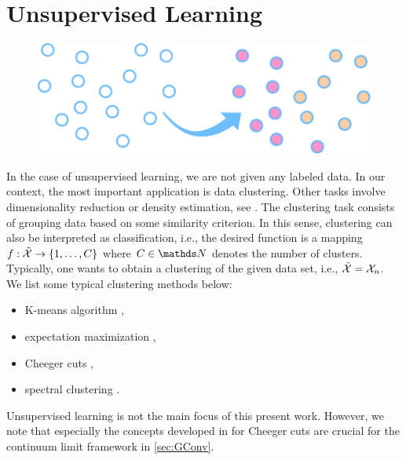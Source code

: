 \section{Unsupervised Learning}
\begin{figure}
\centering
\includegraphics[width=.5\textwidth]{atelier/paradigms/UL.pdf}
\end{figure}

In the case of unsupervised learning, we are not given any labeled data. In our context, the most important application is data clustering. Other tasks involve dimensionality reduction or density estimation, see \cite{subramanya2014graph}. The clustering task consists of grouping data based on some similarity criterion. In this sense, clustering can also be interpreted as classification, i.e., the desired function is a mapping $f:\tilde{\mathcal{X}}\to \{1,\ldots, C\}$ where $C\in\N$ denotes the number of clusters. Typically, one wants to obtain a clustering of the given data set, i.e., $\tilde{\mathcal{X}} = \mathcal{X}_n$. We list some typical clustering methods below:
%
\begin{itemize}
\item K-means algorithm \cite{steinhaus1956division},
\item expectation maximization  \cite{dempster1977maximum},
\item Cheeger cuts \cite{GarcSlep15, szlam2009total, trillos2016consistency, garcia2022graph},
\item spectral clustering \cite{trillos2018variational, trillos2021geometric, hoffmann2022spectral}.
\end{itemize}
%
%
Unsupervised learning is not the main focus of this present work. However, we note that especially the concepts developed in \cite{GarcSlep15} for Cheeger cuts are crucial for the continuum limit framework in \cref{sec:GConv}.

